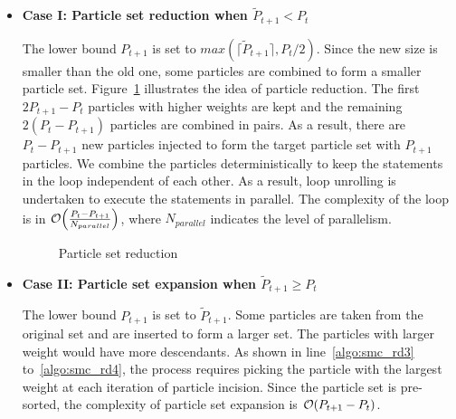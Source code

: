 \begin{itemize}
\item {\bf Case I: Particle set reduction when $\widetilde{P}_{t+1} < P_{t}$} 

The lower bound $P_{t+1}$ is set to $max\left(\lceil\widetilde{P}_{t+1}\rceil, P_{t}/2\right)$.
Since the new size is smaller than the old one, some particles are combined to form a smaller particle set.
Figure~\ref{fig:tuning} illustrates the idea of particle reduction.
The first $2P_{t+1}-P_{t}$ particles with higher weights are kept and the remaining $2(P_{t}-P_{t+1})$ particles are combined in pairs.
As a result, there are $P_{t}-P_{t+1}$ new particles injected to form the target particle set with $P_{t+1}$ particles.
We combine the particles deterministically to keep the statements in the loop independent of each other.
As a result, loop unrolling is undertaken to execute the statements in parallel.
The complexity of the loop is in $\mathop{}\mathopen{}\mathcal{O}\mathopen{}\left(\frac{P_{t}-P_{t+1}}{N_{parallel}}\right)$, where $N_{parallel}$ indicates the level of parallelism.

\setcounter{subfigure}{0}
\begin{figure}[t!]
\centering
{}
\caption{Particle set reduction}
\label{fig:tuning}
\end{figure}

\item {\bf Case II: Particle set expansion when $\widetilde{P}_{t+1} \geq P_{t}$}

The lower bound $P_{t+1}$ is set to $\widetilde{P}_{t+1}$.
Some particles are taken from the original set and are inserted to form a larger set.
The particles with larger weight would have more descendants.
As shown in line~\ref{algo:smc_rd3} to~\ref{algo:smc_rd4}, the process requires picking the particle with the largest weight at each iteration of particle incision.
Since the particle set is pre-sorted, the complexity of particle set expansion is $\mathop{}\mathopen{}\mathcal{O}\mathopen{}\left(P_{t+1}-P_{t}\right)$.

\end{itemize}

